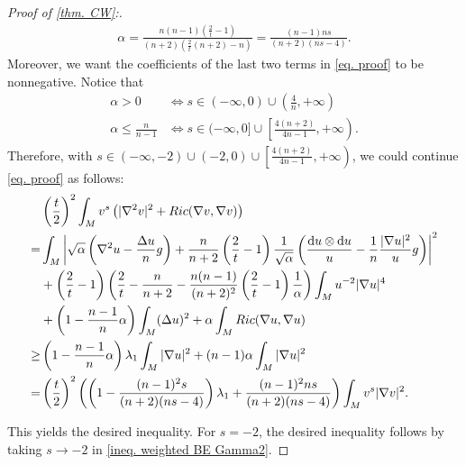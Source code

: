 \documentclass[11pt]{amsart}
\numberwithin{equation}{section}
\numberwithin{lemma}{section}
\numberwithin{proposition}{section}
\numberwithin{corollary}{section}
\numberwithin{remark}{section}
\newcommand{\dd}{\mathop{}\!\mathrm{d}}%
\begin{document}
\begin{proof}[Proof of \cref{thm. CW}:]
\begin{align*}
     \alpha=\frac{n(n-1)\left(\frac{2}{t}-1\right)}{(n+2)\left(\frac{2}{t}(n+2)-n\right)}
        =\frac{(n-1)ns}{(n+2)(ns-4)}.
 \end{align*}
 Moreover, we want  the coefficients of the last two terms in \cref{eq. proof} to be nonnegative. Notice that
 \begin{align*}
     \alpha>0&\Longleftrightarrow
     s\in (-\infty,0)\cup \left(\frac{4}{n},+\infty\right)\\
     \alpha\leq \frac{n}{n-1}
     &\Longleftrightarrow
     s\in(-\infty,0]\cup\left[\frac{4(n+2)}{4n-1},+\infty\right).
 \end{align*}
 Therefore, with $s\in (-\infty,-2)\cup(-2,0)\cup\left[\frac{4(n+2)}{4n-1},+\infty\right)$, we could continue \cref{eq. proof} as follows:
 \begin{align*}
     & \left(\frac{t}{2}\right)^2
     \int_{M} v^s
     \left(|\nabla^2 v|^2
     +Ric(\nabla v,\nabla v)
     \right)\\
     =&\int_M \left|\sqrt{\alpha}
     \left(\nabla^2 u-\frac{\Delta u}{n}g\right)
     +\frac{n}{n+2}
     \left(\frac{2}{t}-1\right)
     \frac{1}{\sqrt{\alpha}}
     \left(
     \frac{\dd u\otimes \dd u}{u}-\frac{1}{n}\frac{|\nabla u|^2}{u}g
     \right)
     \right|^2\notag\\
     &+\left(\frac{2}{t}-1\right)
     \left(
     \frac{2}{t}-\frac{n}{n+2}
     -\frac{n(n-1)}{(n+2)^2}
     \left(\frac{2}{t}-1\right)
     \frac{1}{\alpha}
     \right)\int_M u^{-2}|\nabla u|^4\notag\\
     &+\left(1-\frac{n-1}{n}\alpha\right)\int_M (\Delta u)^2
     +\alpha\int_M Ric(\nabla u,\nabla u)\\
     \geq& 
     \left(1-\frac{n-1}{n}\alpha\right)\lambda_1
     \int_M |\nabla u|^2
     +(n-1)\alpha\int_M |\nabla u|^2\\
     =&\left(\frac{t}{2}\right)^2
     \left(\left(1-\frac{(n-1)^2s}{(n+2)(ns-4)}\right)\lambda_1
        +\frac{(n-1)^2ns}{(n+2)(ns-4)}
        \right)
        \int_M v^s|\nabla v|^2.
     \end{align*}

    This yields the desired inequality. For $s=-2$, the desired inequality follows by taking $s\to -2$ in \cref{ineq. weighted BE Gamma2}. 
 \end{proof}
 
\end{document}
